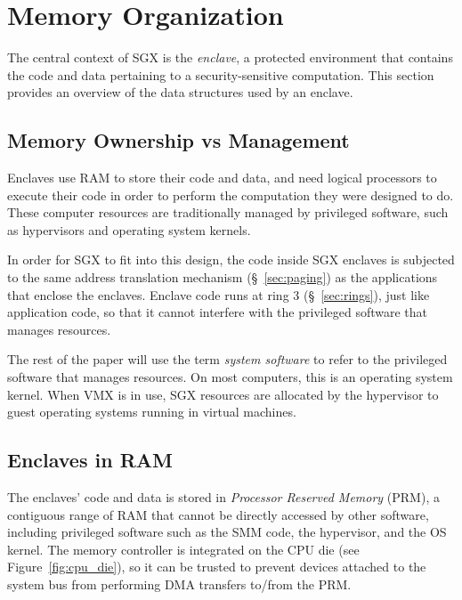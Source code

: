 \section{Memory Organization}
\label{sec:memory}

The central context of SGX is the \textit{enclave}, a protected environment
that contains the code and data pertaining to a security-sensitive computation.
This section provides an overview of the data structures used by an enclave.


\subsection{Memory Ownership vs Management}


Enclaves use RAM to store their code and data, and need logical processors to
execute their code in order to perform the computation they were designed to
do. These computer resources are traditionally managed by privileged software,
such as hypervisors and operating system kernels.

In order for SGX to fit into this design, the code inside SGX enclaves is
subjected to the same address translation mechanism (\S~\ref{sec:paging}) as
the applications that enclose the enclaves. Enclave code runs at ring 3
(\S~\ref{sec:rings}), just like application code, so that it cannot
interfere with the privileged software that manages resources.


The rest of the paper will use the term \textit{system software} to refer to
the privileged software that manages resources. On most computers, this is an
operating system kernel. When VMX is in use, SGX resources are allocated by
the hypervisor to guest operating systems running in virtual machines.


\subsection{Enclaves in RAM}
\label{sec:prm}


The enclaves' code and data is stored in \textit{Processor Reserved Memory}
(PRM), a contiguous range of RAM that cannot be directly accessed by other
software, including privileged software such as the SMM code, the hypervisor,
and the OS kernel. The memory controller is integrated on the CPU die (see
Figure~\ref{fig:cpu_die}), so it can be trusted to prevent devices attached to
the system bus from performing DMA transfers to/from the PRM.

